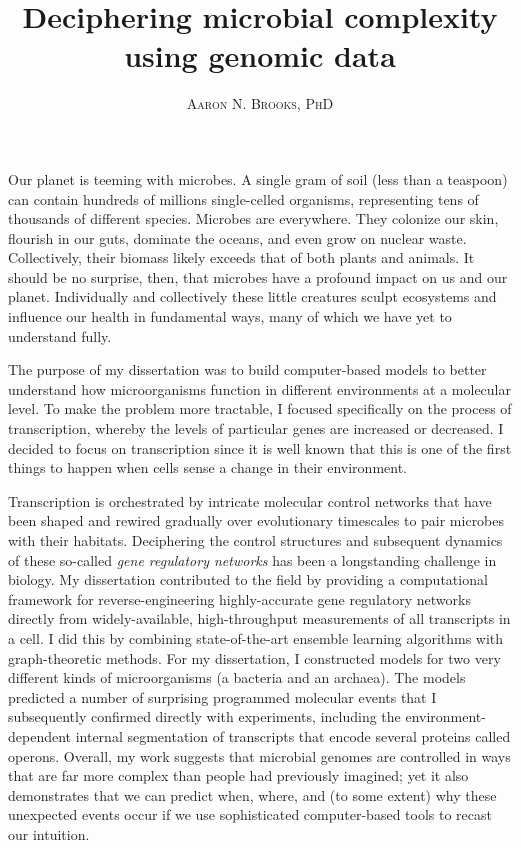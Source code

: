 \documentclass{article}
\title{\vspace{-15mm}\fontsize{20pt}{10pt}\selectfont\textbf{Deciphering microbial complexity using genomic data}} %
\author{
\large
{\textsc{ Aaron N. Brooks, PhD }}\\[0.1mm]
}
\date{}
\begin{document}
\maketitle %
\thispagestyle{fancy} %

Our planet is teeming with microbes. A single gram of soil (less than a teaspoon) can contain hundreds of millions single-celled organisms, representing tens of thousands of different species. Microbes are everywhere. They colonize our skin, flourish in our guts, dominate the oceans, and even grow on nuclear waste. Collectively, their biomass likely exceeds that of both plants and animals. It should be no surprise, then, that microbes have a profound impact on us and our planet. Individually and collectively these little creatures sculpt ecosystems and influence our health in fundamental ways, many of which we have yet to understand fully. 

The purpose of my dissertation was to build computer-based models to better understand how microorganisms function in different environments at a molecular level. To make the problem more tractable, I focused specifically on the process of transcription, whereby the levels of particular genes are increased or decreased. I decided to focus on transcription since it is well known that this is one of the first things to happen when cells sense a change in their environment. 

Transcription is orchestrated by intricate molecular control networks that have been shaped and rewired gradually over evolutionary timescales to pair microbes with their habitats. Deciphering the control structures and subsequent dynamics of these so-called \textit{gene regulatory networks} has been a longstanding challenge in biology. My dissertation contributed to the field by providing a computational framework for reverse-engineering highly-accurate gene regulatory networks directly from widely-available, high-throughput measurements of all transcripts in a cell. I did this by combining state-of-the-art ensemble learning algorithms with graph-theoretic methods. For my dissertation, I constructed models for two very different kinds of microorganisms (a bacteria and an archaea).  The models predicted a number of surprising programmed molecular events that I subsequently confirmed directly with experiments, including the environment-dependent internal segmentation of transcripts that encode several proteins called operons. Overall, my work suggests that microbial genomes are controlled in ways that are far more complex than people had previously imagined; yet it also demonstrates that we can predict when, where, and (to some extent) why these unexpected events occur if we use sophisticated computer-based tools to recast our intuition. 
\end{document}

